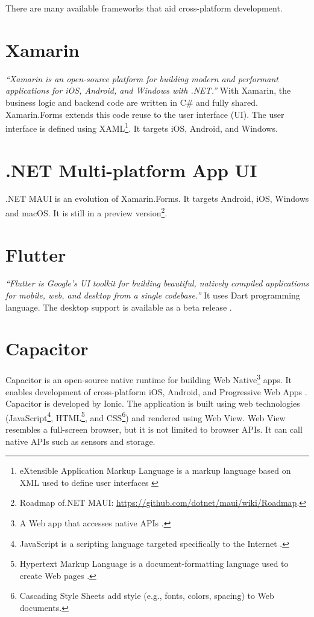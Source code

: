 \documentclass[
  digital, %
  table,   %
  oneside, %
  lof,     %
  lot,     %
]{fithesis3}
\begin{document}
There are many available frameworks that aid cross-platform development.

\section{Xamarin}
\textit{``Xamarin is an open-source platform for building modern and performant applications for iOS, Android, and Windows with .NET.''} \cite{WhatIsXamarin} With Xamarin, the business logic and backend code are written in C\# and fully shared.
Xamarin.Forms extends this code reuse to the user interface (UI). The user interface is defined using XAML\footnote{eXtensible Application Markup Language is a markup language based on XML used to define user interfaces \cite{Hermes2019Building}}. It targets iOS, Android, and Windows.

\section{.NET Multi-platform App UI}
.NET MAUI is an evolution of Xamarin.Forms. It targets Android, iOS, Windows and macOS. It is still in a preview version\footnote{Roadmap of.NET MAUI: \url{https://github.com/dotnet/maui/wiki/Roadmap}.}.

\section{Flutter}
\textit{``Flutter is Google’s UI toolkit for building beautiful, natively compiled applications for mobile, web, and desktop from a single codebase.''} \cite{FlutterHomepage} It uses Dart programming language. The desktop support is available as a beta release \cite{FlutterDesktopSupport}.

\section{Capacitor}
Capacitor is an open-source native runtime for building Web Native\footnote{A Web app that accesses native APIs \cite{WebNative}.} apps. It enables development of cross-platform iOS, Android, and Progressive Web Apps \cite{CapacitorHomepage}. Capacitor is developed by Ionic. The application is built using web technologies (JavaScript\footnote{JavaScript is a scripting language targeted specifically to the Internet \cite{GartnerJavaScript}.}, HTML\footnote{Hypertext Markup Language is a document-formatting language used to create Web pages \cite{GartnerHTML}.}, and CSS\footnote{Cascading Style Sheets add style (e.g., fonts, colors, spacing) to Web documents\cite{W3CCSS}.}) and rendered using Web View. Web View resembles a full-screen browser, but it is not limited to browser APIs. It can call native APIs such as sensors and storage.
\end{document}
